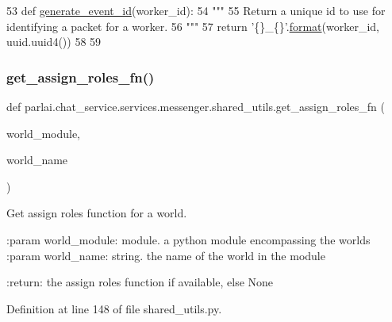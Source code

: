 \begin{DoxyCode}
53 \textcolor{keyword}{def }\hyperlink{namespaceparlai_1_1mturk_1_1core_1_1shared__utils_aba2e4d48063dafc80e931f8925dbb755}{generate\_event\_id}(worker\_id):
54     \textcolor{stringliteral}{"""}
55 \textcolor{stringliteral}{    Return a unique id to use for identifying a packet for a worker.}
56 \textcolor{stringliteral}{    """}
57     \textcolor{keywordflow}{return} \textcolor{stringliteral}{'\{\}\_\{\}'}.\hyperlink{namespaceparlai_1_1mturk_1_1core_1_1shared__utils_a9cd2c4b48b3efc5296be64d403e00151}{format}(worker\_id, uuid.uuid4())
58 
59 
\end{DoxyCode}
\mbox{\label{namespaceparlai_1_1chat__service_1_1services_1_1messenger_1_1shared__utils_a1cf883c977b3fcd06db0d998ae976871}} 
\subsubsection{\texorpdfstring{get\+\_\+assign\+\_\+roles\+\_\+fn()}{get\_assign\_roles\_fn()}}
{\footnotesize\ttfamily def parlai.\+chat\+\_\+service.\+services.\+messenger.\+shared\+\_\+utils.\+get\+\_\+assign\+\_\+roles\+\_\+fn (\begin{DoxyParamCaption}\item[{}]{world\+\_\+module,  }\item[{}]{world\+\_\+name }\end{DoxyParamCaption})}

\begin{DoxyVerb}Get assign roles function for a world.

:param world_module:
    module. a python module encompassing the worlds
:param world_name:
    string. the name of the world in the module

:return:
    the assign roles function if available, else None
\end{DoxyVerb}
 

Definition at line 148 of file shared\+\_\+utils.\+py.


